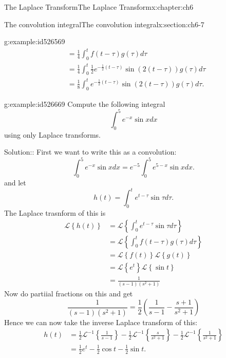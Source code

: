 \documentclass[oneside,10pt,]{book}
\numberwithin{equation}{section}
\numberwithin{equation}{section}
\newcommand{\amp}{&}
\begin{document}
\begin{chapterptx}{The Laplace Transform}{}{The Laplace Transform}{}{}{x:chapter:ch6}
\begin{sectionptx}{The convolution integral}{}{The convolution integral}{}{}{x:section:ch6-7}
\begin{example}{}{g:example:id526569}
\begin{align*}
\amp =\frac{1}{4}\int_{0}^{t}f\left(t-\tau\right)g\left(\tau\right)d\tau\\
\amp =\frac{1}{4}\int_{0}^{t}\frac{1}{2}e^{-\frac{1}{2}\left(t-\tau\right)}\sin\left(2\left(t-\tau\right)\right)g\left(\tau\right)d\tau\\
\amp =\frac{1}{8}\int_{0}^{t}e^{-\frac{1}{2}\left(t-\tau\right)}\sin\left(2\left(t-\tau\right)\right)g\left(\tau\right)d\tau.
\end{align*}
%
\end{example}
\begin{example}{}{g:example:id526669}%
Compute the following integral%
\begin{equation*}
\int_{0}^{5}e^{-x}\sin xdx
\end{equation*}
using only Laplace transforms.%
\par
Solution:: First we want to write this as a convolution:%
\begin{equation*}
\int_{0}^{5}e^{-x}\sin xdx=e^{-5}\int_{0}^{5}e^{5-x}\sin xdx.
\end{equation*}
and let%
\begin{equation*}
h(t)=\int_{0}^{t}e^{t-\tau}\sin\tau d\tau.
\end{equation*}
The Laplace trasnform of this is%
\begin{align*}
\mathcal{L}\left\{ h(t)\right\}  \amp =\mathcal{L}\left\{ \int_{0}^{t}e^{t-\tau}\sin\tau d\tau\right\} \\
\amp =\mathcal{L}\left\{ \int_{0}^{t}f(t-\tau)g(\tau)d\tau\right\} \\
\amp =\mathcal{L}\left\{ f(t)\right\} \mathcal{L}\left\{ g(t)\right\} \\
\amp =\mathcal{L}\left\{ e^{t}\right\} \mathcal{L}\left\{ \sin t\right\} \\
\amp =\frac{1}{\left(s-1\right)\left(s^{2}+1\right)}
\end{align*}
Now do partiial fractions on this and get%
\begin{equation*}
\frac{1}{\left(s-1\right)\left(s^{2}+1\right)}=\frac{1}{2}\left(\frac{1}{s-1}-\frac{s+1}{s^{2}+1}\right)
\end{equation*}
Hence we can now take the inverse Laplace transform of this:%
\begin{align*}
h(t) \amp =\frac{1}{2}\mathcal{L}^{-1}\left\{ \frac{1}{s-1}\right\} -\frac{1}{2}\mathcal{L}^{-1}\left\{ \frac{s}{s^{2}+1}\right\} -\frac{1}{2}\mathcal{L}^{-1}\left\{ \frac{1}{s^{2}+1}\right\} \\
\amp =\frac{1}{2}e^{t}-\frac{1}{2}\cos t-\frac{1}{2}\sin t.

\end{align*}
\end{example}
\end{sectionptx}
\end{chapterptx}
\end{document}
